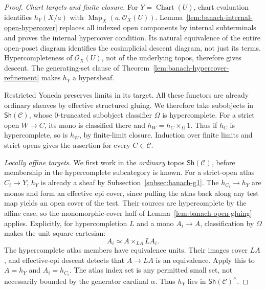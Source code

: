 \documentclass[12pt]{amsart}
\theoremstyle{definition}
\theoremstyle{remark}
\numberwithin{equation}{section}
\newcommand{\Sh}{\mathsf{Sh}}
\DeclareMathOperator{\Map}{Map}
\begin{document}
\begin{proof}
\emph{Chart targets and finite closure.}
For $Y=\operatorname{Chart}(U)$, chart evaluation
identifies $h_Y(X/a)$ with
$\Map_X(a,\mathcal O_X(U))$.
Lemma~\ref{lem:banach-internal-open-hypercover}
replaces all indexed open components by internal
subterminals and proves the internal hypercover
condition. Its natural equivalence of the entire
open-poset diagram identifies the cosimplicial
descent diagram, not just its terms. Hypercompleteness
of $\mathcal O_X(U)$, not of the underlying topos,
therefore gives descent. The generating-set clause
of Theorem~\ref{lem:banach-hypercover-refinement}
makes $h_Y$ a hypersheaf.

Restricted Yoneda preserves limits in its target.
All these functors are already ordinary sheaves
by effective structured gluing. We therefore take
subobjects in $\Sh(\mathcal C)$, whose $0$-truncated
subobject classifier $\Omega$ is hypercomplete.
For a strict open $W\to C$, its mono is classified
there and
$h_W=h_C\times_\Omega1$. Thus if $h_C$ is
hypercomplete, so is $h_W$, by finite-limit closure.
Induction over finite limits and strict opens
gives the assertion for every $C\in\mathcal C$.

\emph{Locally affine targets.} We first work in the \emph{ordinary}
topos $\Sh(\mathcal C)$, before membership in the hypercomplete
subcategory is known. For a strict-open atlas $C_i\to Y$, $h_Y$ is
already a sheaf by
Subsection~\ref{subsec:banach-g1}. The $h_{C_i}\to h_Y$ are monos
and form an effective epi cover, since pulling the atlas back along
any test map yields an open cover of the test. Their sources are
hypercomplete by the affine case, so the monomorphic-cover half of
Lemma~\ref{lem:banach-open-gluing} applies. Explicitly,
for hypercompletion $L$ and a mono $A_i\to A$,
classification by $\Omega$ makes the unit square
cartesian:
\[
 A_i\simeq A\times_{LA}LA_i.
\]
The hypercomplete atlas members have equivalence
units. Their images cover $LA$, and effective-epi
descent detects that $A\to LA$ is an equivalence.
Apply this to $A=h_Y$ and $A_i=h_{C_i}$.
The atlas index set is any permitted small set,
not necessarily bounded by the generator cardinal
$\alpha$. Thus $h_Y$ lies in $\Sh(\mathcal C)^\wedge$.


\end{proof}
\end{document}
